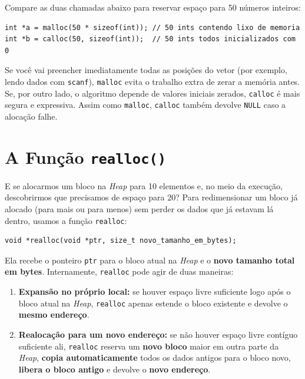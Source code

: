 Compare as duas chamadas abaixo para reservar espaço para 50 números inteiros:

\begin{lstlisting}
int *a = malloc(50 * sizeof(int)); // 50 ints contendo lixo de memoria
int *b = calloc(50, sizeof(int));  // 50 ints todos inicializados com 0
\end{lstlisting}

Se você vai preencher imediatamente todas as posições do vetor (por exemplo, lendo dados com \texttt{scanf}), \texttt{malloc} evita o trabalho extra de zerar a memória antes. Se, por outro lado, o algoritmo depende de valores iniciais zerados, \texttt{calloc} é mais segura e expressiva. Assim como \texttt{malloc}, \texttt{calloc} também devolve \texttt{NULL} caso a alocação falhe.

\section{A Função \texttt{realloc()}}
\label{sec:funcao-realloc}

E se alocarmos um bloco na \textit{Heap} para 10 elementos e, no meio da execução, descobrirmos que precisamos de espaço para 20? Para redimensionar um bloco já alocado (para mais ou para menos) sem perder os dados que já estavam lá dentro, usamos a função \texttt{realloc}:

\begin{lstlisting}
void *realloc(void *ptr, size_t novo_tamanho_em_bytes);
\end{lstlisting}

Ela recebe o ponteiro \texttt{ptr} para o bloco atual na \textit{Heap} e o \textbf{novo tamanho total em bytes}. Internamente, \texttt{realloc} pode agir de duas maneiras:

\begin{enumerate}
    \item \textbf{Expansão no próprio local:} se houver espaço livre suficiente logo após o bloco atual na \textit{Heap}, \texttt{realloc} apenas estende o bloco existente e devolve o \textbf{mesmo endereço}.
    \item \textbf{Realocação para um novo endereço:} se não houver espaço livre contíguo suficiente ali, \texttt{realloc} reserva um \textbf{novo bloco} maior em outra parte da \textit{Heap}, \textbf{copia automaticamente} todos os dados antigos para o bloco novo, \textbf{libera o bloco antigo} e devolve o \textbf{novo endereço}.
\end{enumerate}

